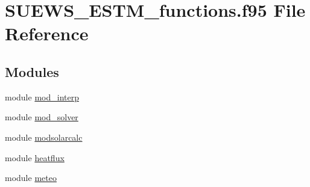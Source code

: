 \hypertarget{_s_u_e_w_s___e_s_t_m__functions_8f95}{}\section{S\+U\+E\+W\+S\+\_\+\+E\+S\+T\+M\+\_\+functions.\+f95 File Reference}
\label{_s_u_e_w_s___e_s_t_m__functions_8f95}
\subsection*{Modules}
\begin{DoxyCompactItemize}
\item 
module \hyperlink{namespacemod__interp}{mod\+\_\+interp}
\item 
module \hyperlink{namespacemod__solver}{mod\+\_\+solver}
\item 
module \hyperlink{namespacemodsolarcalc}{modsolarcalc}
\item 
module \hyperlink{namespaceheatflux}{heatflux}
\item 
module \hyperlink{namespacemeteo}{meteo}
\end{DoxyCompactItemize}
